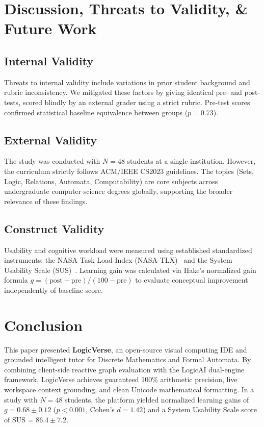\documentclass[conference]{IEEEtran}
\begin{document}
\section{Discussion, Threats to Validity, \& Future Work}

\subsection{Internal Validity}
Threats to internal validity include variations in prior student background and rubric inconsistency. We mitigated these factors by giving identical pre- and post-tests, scored blindly by an external grader using a strict rubric. Pre-test scores confirmed statistical baseline equivalence between groups ($p = 0.73$).

\subsection{External Validity}
The study was conducted with $N = 48$ students at a single institution. However, the curriculum strictly follows ACM/IEEE CS2023 guidelines. The topics (Sets, Logic, Relations, Automata, Computability) are core subjects across undergraduate computer science degrees globally, supporting the broader relevance of these findings.

\subsection{Construct Validity}
Usability and cognitive workload were measured using established standardized instruments: the NASA Task Load Index (NASA-TLX)~\cite{hart1988} and the System Usability Scale (SUS)~\cite{brooke1996}. Learning gain was calculated via Hake's normalized gain formula $g = (\text{post} - \text{pre}) / (100 - \text{pre})$ to evaluate conceptual improvement independently of baseline score.

\section{Conclusion}
This paper presented \textbf{LogicVerse}, an open-source visual computing IDE and grounded intelligent tutor for Discrete Mathematics and Formal Automata. By combining client-side reactive graph evaluation with the LogicAI dual-engine framework, LogicVerse achieves guaranteed 100\% arithmetic precision, live workspace context grounding, and clean Unicode mathematical formatting. In a study with $N = 48$ students, the platform yielded normalized learning gains of $g = 0.68 \pm 0.12$ ($p < 0.001$, Cohen's $d = 1.42$) and a System Usability Scale score of SUS = $86.4 \pm 7.2$.
\end{document}
